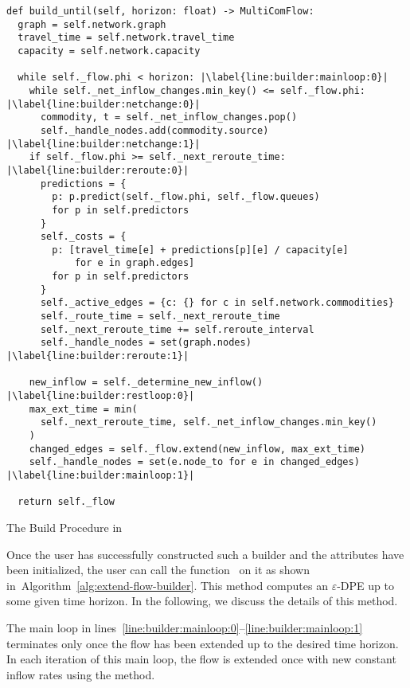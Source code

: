 \begin{algorithm}
  \begin{verbatim}
def build_until(self, horizon: float) -> MultiComFlow:
  graph = self.network.graph
  travel_time = self.network.travel_time
  capacity = self.network.capacity

  while self._flow.phi < horizon: |\label{line:builder:mainloop:0}|
    while self._net_inflow_changes.min_key() <= self._flow.phi: |\label{line:builder:netchange:0}|
      commodity, t = self._net_inflow_changes.pop()
      self._handle_nodes.add(commodity.source) |\label{line:builder:netchange:1}|
    if self._flow.phi >= self._next_reroute_time: |\label{line:builder:reroute:0}|
      predictions = {
        p: p.predict(self._flow.phi, self._flow.queues)
        for p in self.predictors
      }
      self._costs = {
        p: [travel_time[e] + predictions[p][e] / capacity[e]
            for e in graph.edges]
        for p in self.predictors
      }
      self._active_edges = {c: {} for c in self.network.commodities}
      self._route_time = self._next_reroute_time
      self._next_reroute_time += self.reroute_interval
      self._handle_nodes = set(graph.nodes) |\label{line:builder:reroute:1}|

    new_inflow = self._determine_new_inflow() |\label{line:builder:restloop:0}|
    max_ext_time = min(
      self._next_reroute_time, self._net_inflow_changes.min_key()
    )
    changed_edges = self._flow.extend(new_inflow, max_ext_time)
    self._handle_nodes = set(e.node_to for e in changed_edges) |\label{line:builder:mainloop:1}|

  return self._flow
\end{verbatim}
\caption{The Build Procedure in }
\label{alg:extend-flow-builder}
\end{algorithm}

Once the user has successfully constructed such a builder and the attributes have been initialized, the user can call the function~ on it as shown in~Algorithm~\ref{alg:extend-flow-builder}.
This method computes an $\varepsilon$-DPE up to some given time horizon.
In the following, we discuss the details of this method.

The main loop in lines~\ref{line:builder:mainloop:0}--\ref{line:builder:mainloop:1} 
terminates only once the flow has been extended up to the desired time horizon.
In each iteration of this main loop, the flow is extended once with new constant inflow rates using the  method.

